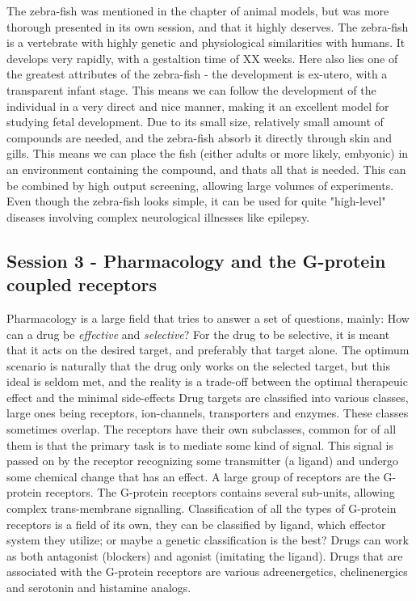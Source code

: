\documentclass[12p]{article}
\begin{document}
The zebra-fish was mentioned in the chapter of animal models, but was more thorough presented in its own session, and that it highly deserves.
The zebra-fish is a vertebrate with highly genetic and physiological similarities with humans.
It develops very rapidly, with a gestaltion time of XX weeks.
Here also lies one of the greatest attributes of the zebra-fish - the development is ex-utero, with a transparent infant stage.
This means we can follow the development of the individual in a very direct and nice manner, making it an excellent model for studying fetal development.
Due to its small size, relatively small amount of compounds are needed, and the zebra-fish absorb it directly through skin and gills.
This means we can place the fish (either adults or more likely, embyonic) in an environment containing the compound, and thats all that is needed.
This can be combined by high output screening, allowing large volumes of experiments.
Even though the zebra-fish looks simple, it can be used for quite "high-level" diseases involving complex neurological illnesses like epilepsy.

\subsection*{Session 3 - Pharmacology and the G-protein coupled receptors}

Pharmacology is a large field that tries to answer a set of questions, mainly: How can a drug be \emph{effective} and \emph{selective}?
For the drug to be selective, it is meant that it acts on the desired target, and preferably that target alone.
The optimum scenario is naturally that the drug only works on the selected target, but this ideal is seldom met, and the reality is a trade-off between the optimal therapeuic effect and the minimal side-effects
Drug targets are classified into various classes, large ones being receptors, ion-channels, transporters and enzymes. 
These classes sometimes overlap.
The receptors have their own subclasses, common for of all them is that the primary task is to mediate some kind of signal.
This signal is passed on by the receptor recognizing some transmitter (a ligand) and undergo some chemical change that has an effect.
A large group of receptors are the G-protein receptors.
The G-protein receptors contains several sub-units, allowing complex trans-membrane signalling.
Classification of all the types of G-protein receptors is a field of its own, they can be classified by ligand, which effector system they utilize; or maybe a genetic classification is the best?
Drugs can work as both antagonist (blockers) and agonist (imitating the ligand).
Drugs that are associated with the G-protein receptors are various adreenergetics, chelinenergics and serotonin and histamine analogs.
\end{document}
